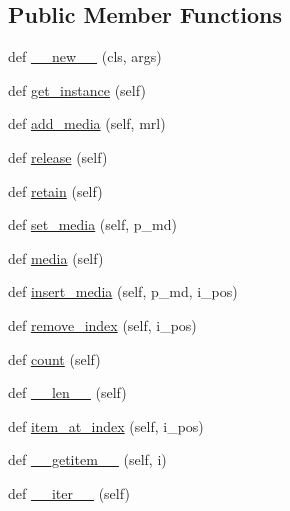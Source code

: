 \subsection*{Public Member Functions}
\begin{DoxyCompactItemize}
\item 
def \hyperlink{classsrc_1_1lib_1_1vlc_1_1MediaList_add545be3c6d1e7b59338979fd2ca7d41}{\+\_\+\+\_\+new\+\_\+\+\_\+} (cls, args)
\item 
def \hyperlink{classsrc_1_1lib_1_1vlc_1_1MediaList_ace46e3907c3dfcfbf7e4de8f87cccd7b}{get\+\_\+instance} (self)
\item 
def \hyperlink{classsrc_1_1lib_1_1vlc_1_1MediaList_a4abfc4b299b9ded65d0e01414b29ba12}{add\+\_\+media} (self, mrl)
\item 
def \hyperlink{classsrc_1_1lib_1_1vlc_1_1MediaList_a650b16ef72f2433f0f6c5efee4f15150}{release} (self)
\item 
def \hyperlink{classsrc_1_1lib_1_1vlc_1_1MediaList_a2ff79029718c19f1a13550d8d5214b42}{retain} (self)
\item 
def \hyperlink{classsrc_1_1lib_1_1vlc_1_1MediaList_a90164edbf5deee0b20618df376a0bdbc}{set\+\_\+media} (self, p\+\_\+md)
\item 
def \hyperlink{classsrc_1_1lib_1_1vlc_1_1MediaList_a397d000080e64e0e2325d0b5d9cafac6}{media} (self)
\item 
def \hyperlink{classsrc_1_1lib_1_1vlc_1_1MediaList_ab1d2aecb1245171a160e2cb232bcba09}{insert\+\_\+media} (self, p\+\_\+md, i\+\_\+pos)
\item 
def \hyperlink{classsrc_1_1lib_1_1vlc_1_1MediaList_a713acf30b7bc9738b2c579c3b098e49a}{remove\+\_\+index} (self, i\+\_\+pos)
\item 
def \hyperlink{classsrc_1_1lib_1_1vlc_1_1MediaList_a042a0c4f8a82ae1d3ada30554326fd67}{count} (self)
\item 
def \hyperlink{classsrc_1_1lib_1_1vlc_1_1MediaList_af951143b03143deefde7d1adbe034072}{\+\_\+\+\_\+len\+\_\+\+\_\+} (self)
\item 
def \hyperlink{classsrc_1_1lib_1_1vlc_1_1MediaList_a26e54d4ff1064b281d8f84a5f38b6abc}{item\+\_\+at\+\_\+index} (self, i\+\_\+pos)
\item 
def \hyperlink{classsrc_1_1lib_1_1vlc_1_1MediaList_a69fee887eb9bd11182a2af912335cf19}{\+\_\+\+\_\+getitem\+\_\+\+\_\+} (self, i)
\item 
def \hyperlink{classsrc_1_1lib_1_1vlc_1_1MediaList_a78b5cde7e977455c19ab28e13b4ad7d2}{\+\_\+\+\_\+iter\+\_\+\+\_\+} (self)
\item 

\end{DoxyCompactItemize}
